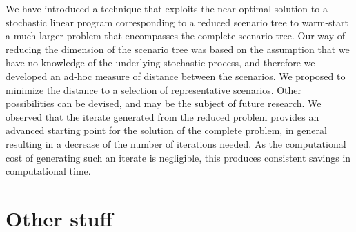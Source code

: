 We have introduced a technique that exploits the near-optimal solution
to a stochastic linear program corresponding to a reduced scenario tree
to warm-start a much larger problem that encompasses the complete
scenario tree.
%
Our way of reducing the dimension of the scenario tree was based on the
assumption that we have no knowledge of the underlying stochastic process,
and therefore we developed an ad-hoc measure of distance between the 
scenarios. 
%
We proposed to minimize the distance to a selection of representative
scenarios. Other possibilities can be devised, and may be the subject
of future research.
%
We observed that the iterate generated from the reduced problem
provides an advanced starting point for the solution of the complete problem,
in general resulting in a decrease of the number of iterations needed.
As the computational cost of generating such an iterate is negligible,
this produces consistent savings in computational time.


%
%
\section{Other stuff}

